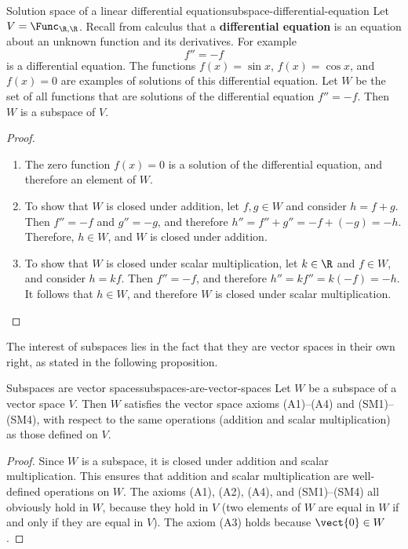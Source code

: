 \begin{example}{Solution space of a linear differential equation}{subspace-differential-equation}
  Let $V=\Func_{\R,\R}$. Recall from calculus that a
  \textbf{differential equation}%
   is an equation about an unknown
  function and its derivatives. For example
  \begin{equation*}
    f'' = -f
  \end{equation*}
  is a differential equation. The functions $f(x)=\sin x$,
  $f(x)=\cos x$, and $f(x)=0$ are examples of solutions of this
  differential equation.  Let $W$ be the set of all functions that are
  solutions of the differential equation $f'' = -f$. Then $W$ is a
  subspace of $V$.
\end{example}

\begin{proof}
  \begin{enumerate}
  \item The zero function $f(x)=0$ is a solution of the differential
    equation, and therefore an element of $W$.
  \item To show that $W$ is closed under addition, let $f,g\in W$ and
    consider $h=f+g$. Then $f''=-f$ and $g''=-g$, and therefore
    $h'' = f'' + g'' = -f+(-g) = -h$. Therefore, $h\in W$, and $W$ is
    closed under addition.
  \item To show that $W$ is closed under scalar multiplication, let
    $k\in\R$ and $f\in W$, and consider $h=kf$. Then $f''=-f$, and
    therefore $h'' = kf'' = k(-f) = -h$. It follows that $h\in W$, and
    therefore $W$ is closed under scalar multiplication.
  \end{enumerate}
\end{proof}

The interest of subspaces lies in the fact that they are vector spaces
in their own right, as stated in the following proposition.

\begin{proposition}{Subspaces are vector spaces}{subspaces-are-vector-spaces}
  Let $W$ be a subspace of a vector space $V$. Then $W$ satisfies the
  vector space axioms (A1)--(A4) and (SM1)--(SM4), with respect to the
  same operations (addition and scalar multiplication) as those
  defined on $V$.
\end{proposition}

\begin{proof}
  Since $W$ is a subspace, it is closed under addition and scalar
  multiplication. This ensures that addition and scalar multiplication
  are well-defined operations on $W$. The axioms (A1), (A2), (A4), and
  (SM1)--(SM4) all obviously hold in $W$, because they hold in $V$
  (two elements of $W$ are equal in $W$ if and only if they are equal
  in $V$). The axiom (A3) holds because $\vect{0}\in W$.
\end{proof}


